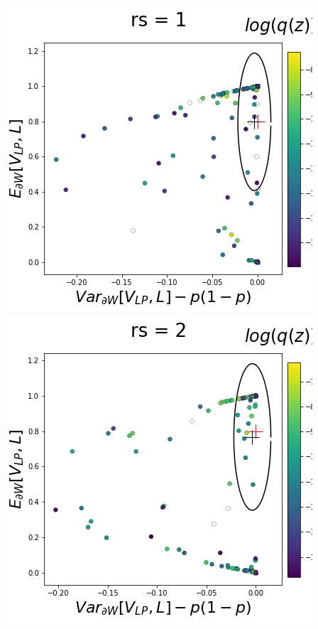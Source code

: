 \documentclass[11pt]{article}
\begin{document}
\begin{center}
\includegraphics[scale=0.33]{figs/T_x_SC_full_c=0_p=80_rs=1.png}
\includegraphics[scale=0.33]{figs/T_x_SC_full_c=0_p=80_rs=2.png}

\end{center}
\end{document}
